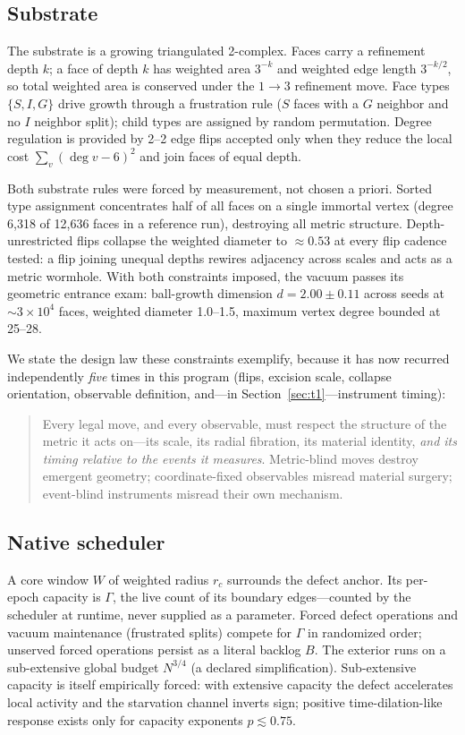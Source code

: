 \documentclass[11pt]{article}
\begin{document}
\subsection{Substrate}
The substrate is a growing triangulated 2-complex. Faces carry a refinement
depth $k$; a face of depth $k$ has weighted area $3^{-k}$ and weighted edge
length $3^{-k/2}$, so total weighted area is conserved under the
$1{\to}3$ refinement move. Face types $\{S,I,G\}$ drive growth through a
frustration rule ($S$ faces with a $G$ neighbor and no $I$ neighbor split);
child types are assigned by random permutation. Degree regulation is provided
by 2--2 edge flips accepted only when they reduce the local cost
$\sum_v(\deg v-6)^2$ and join faces of equal depth.

Both substrate rules were forced by measurement, not chosen a priori. Sorted
type assignment concentrates half of all faces on a single immortal vertex
(degree 6{,}318 of 12{,}636 faces in a reference run), destroying all metric
structure. Depth-unrestricted flips collapse the weighted diameter to
$\approx0.53$ at every flip cadence tested: a flip joining unequal depths
rewires adjacency across scales and acts as a metric wormhole. With both
constraints imposed, the vacuum passes its geometric entrance exam:
ball-growth dimension $d=2.00\pm0.11$ across seeds at $\sim3\times10^4$ faces,
weighted diameter 1.0--1.5, maximum vertex degree bounded at 25--28.

We state the design law these constraints exemplify, because it has now
recurred independently \emph{five} times in this program (flips, excision
scale, collapse orientation, observable definition, and---in
Section~\ref{sec:t1}---instrument timing):
\begin{quote}
Every legal move, and every observable, must respect the structure of the
metric it acts on---its scale, its radial fibration, its material identity,
\emph{and its timing relative to the events it measures}. Metric-blind moves
destroy emergent geometry; coordinate-fixed observables misread material
surgery; event-blind instruments misread their own mechanism.
\end{quote}

\subsection{Native scheduler}
A core window $W$ of weighted radius $r_c$ surrounds the defect anchor. Its
per-epoch capacity is $\Gamma$, the live count of its boundary edges---counted
by the scheduler at runtime, never supplied as a parameter. Forced defect
operations and vacuum maintenance (frustrated splits) compete for $\Gamma$ in
randomized order; unserved forced operations persist as a literal backlog $B$.
The exterior runs on a sub-extensive global budget $N^{3/4}$ (a declared
simplification). Sub-extensive capacity is itself empirically forced: with
extensive capacity the defect accelerates local activity and the starvation
channel inverts sign; positive time-dilation-like response exists only for
capacity exponents $p\lesssim0.75$.
\end{document}
